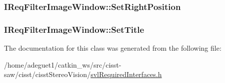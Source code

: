 \hypertarget{class_i_req_filter_image_window_a7f5e8c1b5bbbf3e1f9ea90836f36b4cf}{
\subsubsection[{Set\-Right\-Position}]{ I\-Req\-Filter\-Image\-Window\-::\-Set\-Right\-Position}}\label{class_i_req_filter_image_window_a7f5e8c1b5bbbf3e1f9ea90836f36b4cf}
\hypertarget{class_i_req_filter_image_window_a40613d2152c6d25017adf0f724dc04a4}{
\subsubsection[{Set\-Title}]{ I\-Req\-Filter\-Image\-Window\-::\-Set\-Title}}\label{class_i_req_filter_image_window_a40613d2152c6d25017adf0f724dc04a4}


The documentation for this class was generated from the following file\-:\begin{DoxyCompactItemize}
\item 
/home/adeguet1/catkin\-\_\-ws/src/cisst-\/saw/cisst/cisst\-Stereo\-Vision/\hyperlink{svl_required_interfaces_8h}{svl\-Required\-Interfaces.\-h}\end{DoxyCompactItemize}
